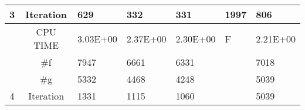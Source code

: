 \documentclass{article}
\begin{document}
\begin{table}[H]
\begin{tabular}{|c|c|l|l|l|l|l|}
		\multirow{-4}{*}{3} & Iteration & {\color[HTML]{000000} 629}      & {\color[HTML]{000000} 332}      & {\color[HTML]{000000} 331}      & {\color[HTML]{000000} 1997}     & {\color[HTML]{000000} 806}      \\ \hline
		& CPU TIME  & {\color[HTML]{000000} 3.03E+00} & {\color[HTML]{000000} 2.37E+00} & {\color[HTML]{000000} 2.30E+00} & {\color[HTML]{000000} F}        & {\color[HTML]{000000} 2.21E+00} \\ \cline{2-7} 
		& \#f       & {\color[HTML]{000000} 7947}     & {\color[HTML]{000000} 6661}     & {\color[HTML]{000000} 6331}     & {\color[HTML]{000000} }         & {\color[HTML]{000000} 7018}     \\ \cline{2-7} 
		& \#g       & {\color[HTML]{000000} 5332}     & {\color[HTML]{000000} 4468}     & {\color[HTML]{000000} 4248}     & {\color[HTML]{000000} }         & {\color[HTML]{000000} 5039}     \\ \cline{2-7} 
		\multirow{-4}{*}{4} & Iteration & {\color[HTML]{000000} 1331}     & {\color[HTML]{000000} 1115}     & {\color[HTML]{000000} 1060}     & {\color[HTML]{000000} }         & {\color[HTML]{000000} 5039}     \\ \hline
	\end{tabular}
\end{table}
\end{document}

